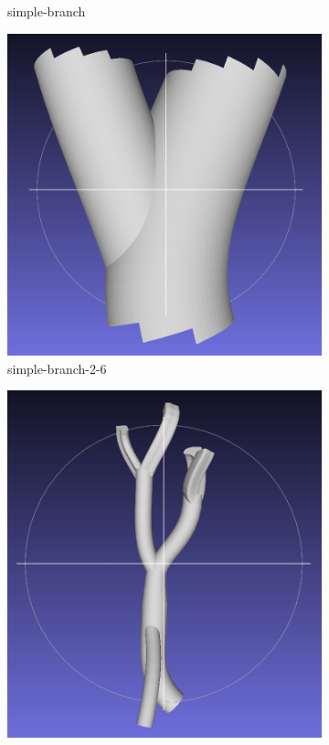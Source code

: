 \documentclass[11p, titlepage]{article}
\begin{document}
\begin{figure}[h!]
\begin{subfigure}[b]{0.3\textwidth}
         \caption{simple-branch}
         \label{fig:simple_branch}
     \end{subfigure}
     \hfill
     \begin{subfigure}[b]{0.3\textwidth}
         \centering
         \includegraphics[width=\textwidth]{originals/simple-branch-2-6}
         \caption{simple-branch-2-6}
         \label{fig:simple_branch_focussed}
     \end{subfigure}
     \hfill
     \begin{subfigure}[b]{0.3\textwidth}
         \centering
         \includegraphics[width=\textwidth]{originals/multi-branch}

\end{subfigure}
\end{figure}
\end{document}

